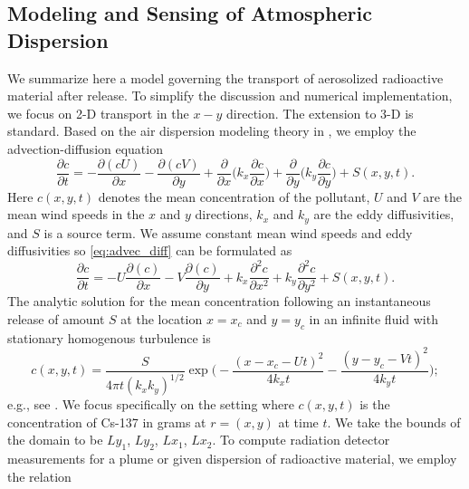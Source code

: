 \documentclass[sn-mathphys-ay]{sn-jnl}
\begin{document}
\subsection{Modeling and Sensing of Atmospheric Dispersion} 
\label{sec:transport}
We summarize here a model governing the transport of aerosolized radioactive material after release. To simplify the discussion and numerical implementation, we focus on 2-D transport in the $x-y$ direction. The extension to 3-D is standard. Based on the air dispersion modeling theory in \citep{Visscher}, we employ the advection-diffusion equation
\begin{equation}
\label{eq:advec_diff}
\frac{\partial c}{\partial t}=-\frac{\partial (c U)}{\partial x}-\frac{\partial (c V)}{\partial y}+\frac{\partial}{\partial x} \bigg(k_{x}\frac{\partial c}{\partial x}\bigg)+\frac{\partial}{\partial y} \bigg(k_{y}\frac{\partial c}{\partial y}\bigg)+S(x,y,t).
\end{equation}
Here $c(x,y,t)$ denotes the mean concentration of the pollutant, $U$ and $V$ are the mean wind speeds in the $x$ and $y$ directions, $k_x$ and $k_y$ are the eddy diffusivities, and $S$ is a source term. We assume constant mean wind speeds and eddy diffusivities so \eqref{eq:advec_diff} can be formulated as
\begin{equation}
\label{eq:advec_diff2}
\frac{\partial c}{\partial t}=-U\frac{\partial (c)}{\partial x}-V\frac{\partial (c)}{\partial y}+k_x\frac{\partial^2 c}{\partial x^2}+k_y\frac{\partial^2 c}{\partial y^2}+S(x,y,t).
\end{equation}
The analytic solution for the mean concentration following an instantaneous release of amount $S$ at the location $x=x_c$ and $y=y_c$ in an infinite fluid with stationary homogenous turbulence is
 \begin{equation}
\label{eq:analytic}
c(x,y,t)=\frac{S}{4\pi t(k_x k_y)^{1/2}} \exp \big(-\frac{(x-x_c-U t)^2}{4k_x t}-\frac{(y-y_c-V t)^2}{4k_y t}\big);
\end{equation}
e.g., see \citep{Visscher}. We focus specifically on the setting where $c(x,y,t)$ is the concentration of Cs-137 in grams at $r=(x,y)$ at time $t$. We take the bounds of the domain to be $Ly_1$, $Ly_2$, $Lx_1$, $Lx_2$. To compute radiation detector measurements for a plume or given dispersion of radioactive material, we employ the relation
\end{document}
